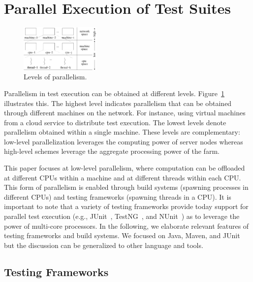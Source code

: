 \newcommand{\Seq}{C0}
\newcommand{\SeqClassParMeth}{C1}
\newcommand{\ParClassSeqMeth}{C2}
\newcommand{\ParClassParMeth}{C3}
\newcommand{\Fork}{F}
\newcommand{\ForkSeq}{\Fork{}\Seq{}}
\newcommand{\ForkParMeth}{\Fork{}\SeqClassParMeth{}}

\section{Parallel Execution of Test Suites}
\label{sec:modes}

\begin{figure}[t!]
  \centering
  \includegraphics[width=0.35\textwidth]{figs/parallel-levels.pdf}
  \vspace{-1ex}
  \caption{\label{fig:levels}Levels of parallelism.}
\end{figure}

Parallelism in test execution can be obtained at different levels.
Figure~\ref{fig:levels} illustrates this.  The highest level indicates
parallelism that can be obtained through different machines on the
network.  For instance, using virtual machines from a cloud service to
distribute test execution.  The lowest levels denote parallelism
obtained within a single machine.  These levels are complementary:
low-level parallelization leverages the computing power of server
nodes whereas high-level schemes leverage the aggregate processing
power of the farm.

This paper focuses at low-level parallelism, where computation can be
offloaded at different CPUs within a machine and at different threads
within each CPU.  This form of parallelism is enabled through build
systems (spawning processes in different CPUs) and testing frameworks
(spawning threads in a CPU).  It is important to note that a variety
of testing frameworks provide today support for parallel test
execution (e.g., JUnit~\cite{junit-org}, TestNG~\cite{testng}, and
NUnit~\cite{nunit}) as to leverage the power of multi-core processors.
In the following, we elaborate relevant features of testing frameworks
and build systems.  We focused on Java, Maven, and JUnit but the
discussion can be generalized to other language and tools.

\subsection{Testing Frameworks}
\label{sec:frameworks}

